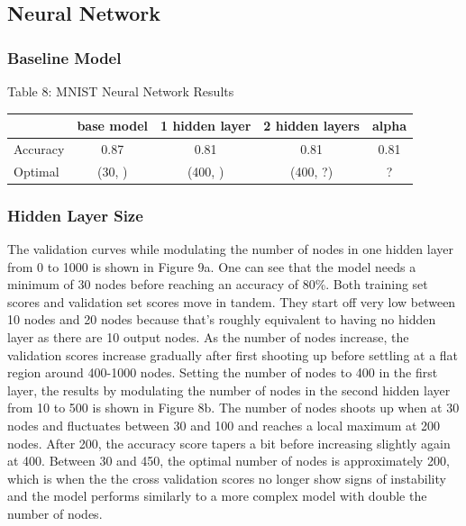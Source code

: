 \documentclass{article}
\begin{document}
\subsection{Neural Network}
\subsubsection*{Baseline Model}
\begin{table}
	
	\centering
	Table 8: MNIST Neural Network Results\\
	\begin{tabular}{ l c c c c }
		\hline
		& base model & 1 hidden layer & 2 hidden layers & alpha \\
		\hline
		Accuracy & 0.87 & 0.81 & 0.81 & 0.81 \\
		Optimal & (30, ) & (400, ) & (400, ?) & ? \\
		
		
		\hline 
	\end{tabular}
\end{table}

\subsubsection*{Hidden Layer Size}

The validation curves while modulating the number of nodes in one hidden layer from 0 to 1000 is shown in Figure 9a. One can see that the model needs a minimum of 30 nodes before reaching an accuracy of 80\%. Both training set scores and validation set scores move in tandem. They start off very low between 10 nodes and 20 nodes because that's roughly equivalent to having no hidden layer as there are 10 output nodes. As the number of nodes increase, the validation scores increase gradually after first shooting up before settling at a flat region around 400-1000 nodes. Setting the number of nodes to 400 in the first layer, the results by modulating the number of nodes in the second hidden layer from 10 to 500 is shown in Figure 8b. The number of nodes shoots up when at 30 nodes and fluctuates between 30 and 100 and reaches a local maximum at 200 nodes. After 200, the accuracy score tapers a bit before increasing slightly again at 400. Between 30 and 450, the optimal number of nodes is approximately 200, which is when the the cross validation scores no longer show signs of instability and the model performs similarly to a more complex model with double the number of nodes. 
\end{document}
